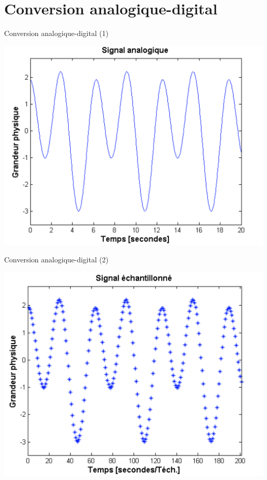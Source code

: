 \section{Conversion
analogique-digital}\label{conversion-analogique-digital}

\begin{frame}{Conversion analogique-digital (1)}

\begin{center}
\includegraphics[width=.8\textwidth]{images/ad_0.png}
\end{center}

\end{frame}

\begin{frame}{Conversion analogique-digital (2)}

\begin{center}
\includegraphics[width=.8\textwidth]{images/ad_1.png}
\end{center}

\end{frame}

